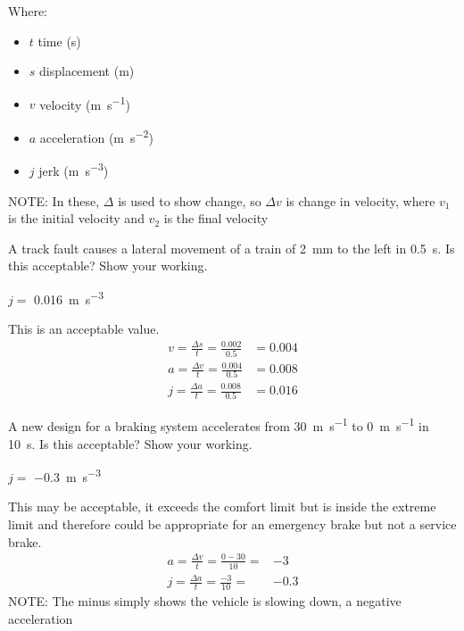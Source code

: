 \documentclass{bcrre_exam}
\begin{document}
Where:
\begin{itemize}
    \item $t$ time (\unit{\second})
    \item $s$ displacement (\unit{\meter})
    \item $v$ velocity (\unit{\meter \per \second})
    \item $a$ acceleration (\unit{\meter \per \second \squared})
    \item $j$ jerk (\unit{\meter \per \second \cubed})
\end{itemize}

NOTE: In these, $\Delta$ is used to show change, so $\Delta v$ is change in velocity, where $v_1$ is the initial velocity and $v_2$ is the final velocity

\begin{questions}

\question
A track fault causes a lateral movement of a train of \qty{2}{mm} to the left in \qty{0.5}{\second}. Is this acceptable? Show your working.
\begin{solution}
    $j=$ \qty{0.016}{\meter \per \second \cubed}

    This is an acceptable value.
    \begin{equation}
        \begin{split}
            v=\frac{\Delta s}{t}=\frac{0.002}{0.5}&=0.004\\
            a=\frac{\Delta v}{t}=\frac{0.004}{0.5}&=0.008\\
            j=\frac{\Delta a}{t}=\frac{0.008}{0.5}&=0.016
        \end{split}
    \end{equation}
\end{solution}

\question
A new design for a braking system accelerates from \qty{30}{\meter \per \second} to \qty{0}{\meter \per \second} in \qty{10}{\second}. Is this acceptable? Show your working.
\begin{solution}
    $j=$ \qty{-0.3}{\meter \per \second \cubed}
    
    This may be acceptable, it exceeds the comfort limit but is inside the extreme limit and therefore could be appropriate for an emergency brake but not a service brake.
    \begin{equation}
        \begin{split}
            a=\frac{\Delta v}{t}=\frac{0-30}{10}=&-3\\
            j=\frac{\Delta a}{t}=\frac{-3}{10}=&-0.3
        \end{split}
    \end{equation}
    NOTE: The minus simply shows the vehicle is slowing down, a negative acceleration
\end{solution}


\end{questions}
\end{document}
